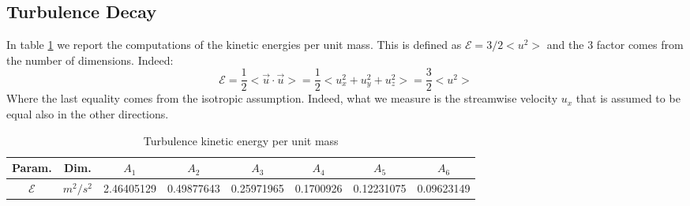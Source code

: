 \documentclass[11pt,titlepage]{article}
\begin{document}
\subsection{Turbulence Decay} \label{turbulence_decay}
In table \ref{tab5} we report the computations of the kinetic energies per unit mass. This is defined as $\mathcal{E} = 3/2<u^2>$ and the $3$ factor comes from the number of dimensions. Indeed: 
\begin{equation*}
	\mathcal{E} = \frac{1}{2} < \vec{u} \cdot \vec{u} >= \frac{1}{2} < u_x^2 + u_y^2 + u_z^2 > = \frac{3}{2} <u^2>
\end{equation*}
Where the last equality comes from the isotropic assumption. Indeed, what we measure is the streamwise velocity $u_x$ that is assumed to be equal also in the other directions.
\begin{table}[h!]
\centering
\caption{Turbulence kinetic energy per unit mass} \label{tab5}
    \begin{tabular}{ | c | c | c | c | c | c | c | c |}
        \hline
        Param. & Dim. & $A_1$ & $A_2$ & $A_3$ & $A_4$ & $A_5$ & $A_6$ \\
        \hline
        $\mathcal{E}$&$m^2/s^2$ &2.46405129& 0.49877643& 0.25971965& 0.1700926 & 0.12231075 &0.09623149  \\
        \hline
    \end{tabular}
\end{table}
\end{document}
